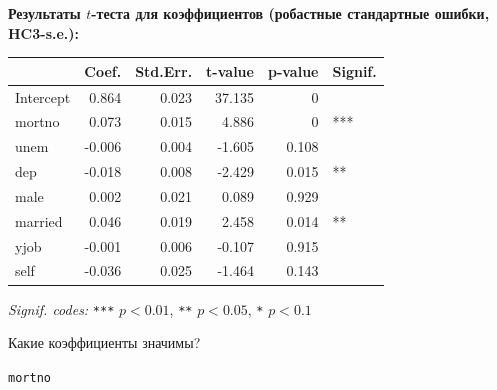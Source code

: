 \documentclass[
  russian,
]{article}
\newcounter{none} %
\begin{document}
\textbf{Результаты \(t\)-теста для коэффициентов (робастные стандартные
ошибки, HC3-s.e.): }

{\def\LTcaptype{none} %
\begin{longtable}[]{@{}lrrrrl@{}}
\toprule\noalign{}
& Coef. & Std.Err. & t-value & p-value & Signif. \\
\midrule\noalign{}
\endhead
\bottomrule\noalign{}
\endlastfoot
Intercept & 0.864 & 0.023 & 37.135 & 0 & \\
mortno & 0.073 & 0.015 & 4.886 & 0 & *** \\
unem & -0.006 & 0.004 & -1.605 & 0.108 & \\
dep & -0.018 & 0.008 & -2.429 & 0.015 & ** \\
male & 0.002 & 0.021 & 0.089 & 0.929 & \\
married & 0.046 & 0.019 & 2.458 & 0.014 & ** \\
yjob & -0.001 & 0.006 & -0.107 & 0.915 & \\
self & -0.036 & 0.025 & -1.464 & 0.143 & \\
\end{longtable}
}

\emph{Signif. codes:} \texttt{***} \(p<0.01\), \texttt{**} \(p<0.05\),
\texttt{*} \(p<0.1\)

Какие коэффициенты значимы?

\begin{tcolorbox}[enhanced jigsaw, arc=.35mm, bottomrule=.15mm, bottomtitle=1mm, breakable, colback=white, colbacktitle=quarto-callout-note-color!10!white, colframe=quarto-callout-note-color-frame, coltitle=black, left=2mm, leftrule=.75mm, opacityback=0, opacitybacktitle=0.6, rightrule=.15mm, title=\textcolor{quarto-callout-note-color}{\faInfo}\hspace{0.5em}{Коэффициенты, значимые на уровне 1\% (по робастным стандартным ошибкам
HC3)}, titlerule=0mm, toprule=.15mm, toptitle=1mm]

\texttt{mortno}

\end{tcolorbox}
\end{document}
